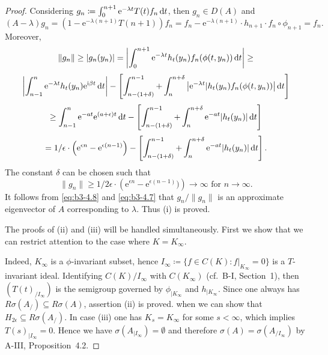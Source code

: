 \begin{proof}
	Considering $g_{n}\coloneq \int_{0}^{n+1} \mathrm{e}^{-\lambda t} T(t)f_{n} \mathop{}\!\mathrm{d}{t}$, then $g_{n} \in D(A)$ and
	\begin{equation}\label{eq:b3-4.7}
		(A - \lambda)g_{n} = (1 - \mathrm{e}^{-\lambda(n+1)}T(n+1))f_{n} = f_{n} - \mathrm{e}^{-\lambda(n+1)} \cdot h_{n+1} \cdot f_{n} \circ \phi_{n+1} = f_{n}.
	\end{equation}
	Moreover,
	\[\|g_{n}\| \geq |g_{n}(y_{n})| = \left|\int_{0}^{n+1} \mathrm{e}^{-\lambda t} h_{t}(y_{n})f_{n}(\phi(t,y_{n})) \mathop{}\!\mathrm{d}{t} \right| \geq\]
	\[\left|\int_{n-1}^{n} \mathrm{e}^{-\lambda t} h_{t}(y_{n}) \mathrm{e}^{\mathrm{i}\beta  t} \mathop{}\!\mathrm{d}{t}\right| - \left[\int_{n-(1+\delta)}^{n-1} + \int_{n}^{n+\delta}\left| \mathrm{e}^{-\lambda t}|h_{t}(y_{n})f_{n}(\phi(t,y_{n}))\right| \mathop{}\!\mathrm{d}{t}\right]\]
	\[\geq \int_{n-1}^{n} \mathrm{e}^{-at} \mathrm{e}^{(a+\epsilon)t} \mathop{}\!\mathrm{d}{t} - \left[\int_{n-(1+\delta)}^{n-1} + \int_{n}^{n+\delta} \mathrm{e}^{-at}|h_{t}(y_{n})| \mathop{}\!\mathrm{d}{t}\right]\]
	\[= 1/\epsilon \cdot\left(\mathrm{e}^{\epsilon n} - \mathrm{e}^{\epsilon(n-1)}\right) - \left[\int_{n-(1+\delta)}^{n-1} + \int_{n}^{n+\delta} \mathrm{e}^{-at}|h_{t}(y_{n})| \mathop{}\!\mathrm{d}{t}\right].\]
	The constant $\delta$ can be chosen such that
	\begin{equation}\label{eq:b3-4.8}
		\|g_{n}\| \geq 1/2\epsilon \cdot\left(\mathrm{e}^{\epsilon n} - \mathrm{e}^{\epsilon(n-1)})\right) \to \infty \text{ for } n \to \infty.
	\end{equation}
	It follows from \eqref{eq:b3-4.8} and \eqref{eq:b3-4.7} that $ g_n / \|g_n\|$ is an approximate
	eigenvector of $A$ corresponding to $\lambda$. 
    Thus (i) is proved. 
	
	The 
	proofs of (ii) and (iii) will be handled simultaneously. 
    First we show that we can restrict attention to the case where $K = K_\infty$.
	
	Indeed, $K_{\infty}$ is a $\phi$-invariant subset, hence $I_{\infty}\coloneq \{f \in C(K) \colon f|_{K_{\infty}} = 0\}$ is a $T$-invariant ideal.
	Identifying $C(K)/I_{\infty}$ with $C(K_{\infty})$ (cf.\ B-I, Section~1), then $(T(t)_{/I_{\infty}})$ is the semigroup governed by $\phi_{|K_{\infty}}$ and $h_{|K_{\infty}}$.
	Since one always has $R{\sigma}(A_{/}) \subseteq R{\sigma}(A)$, assertion (ii) is proved.
	when we can show that $H_{2\epsilon} \subseteq R{\sigma}(A_{/})$.
	In case (iii) one has $K_{s} = K_{\infty}$ for some $s < \infty$, which implies $T(s)_{|I_{\infty}} = 0$.
	Hence we have $\sigma(A_{|I_{\infty}}) = \emptyset$ and therefore $\sigma(A) = \sigma(A_{/I_{\infty}})$ by A-III, Proposition~4.2.
	

\end{proof}
